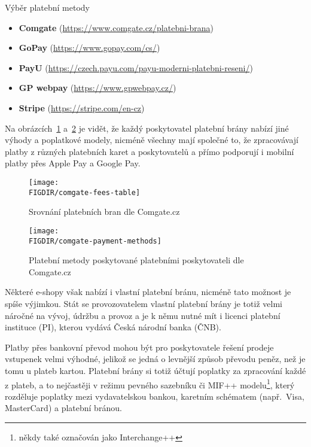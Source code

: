 \begin{subsection}{Výběr platební metody}
    \begin{itemize}
        \item \textbf{Comgate} (\url{https://www.comgate.cz/platebni-brana})
        \item \textbf{GoPay} (\url{https://www.gopay.com/cs/})
        \item \textbf{PayU} (\url{https://czech.payu.com/payu-moderni-platebni-reseni/})
        \item \textbf{GP webpay} (\url{https://www.gpwebpay.cz/})
        \item \textbf{Stripe} (\url{https://stripe.com/en-cz})
    \end{itemize}

    Na obrázcích~\ref{fig:comgate-fees-table} a~\ref{fig:comgate-payment-methods} je vidět, že každý poskytovatel platební brány nabízí jiné výhody a poplatkové modely, nicméně všechny mají společné to, že zpracovávají platby z různých platebních karet a poskytovatelů a přímo podporují i mobilní platby přes Apple Pay a Google Pay.

    \begin{figure}[H]
        \texttt{[image: \\FIGDIR/comgate-fees-table]}
        \centering
        \caption{Srovnání platebních bran dle Comgate.cz~\cite{comgate_srovnani_platebnich_bran}}
        \label{fig:comgate-fees-table}
    \end{figure}

    \begin{figure}[H]
        \texttt{[image: \\FIGDIR/comgate-payment-methods]}
        \centering
        \caption{Platební metody poskytované platebními poskytovateli dle Comgate.cz~\cite{comgate_srovnani_platebnich_bran}}
        \label{fig:comgate-payment-methods}
    \end{figure}

    Některé e-shopy však nabízí i vlastní platební bránu, nicméně tato možnost je spíše výjimkou.
    Stát se provozovatelem vlastní platební brány je totiž velmi náročné na vývoj, údržbu a provoz a je k němu nutné mít i licenci platební instituce (PI)\cite{schejbal_platebni_instituce}, kterou vydává Česká národní banka (ČNB)\cite{cnb_dohled_platebni_instituce}.

    Platby přes bankovní převod mohou být pro poskytovatele řešení prodeje vstupenek velmi výhodné, jelikož se jedná o levnější způsob převodu peněz, než je tomu u plateb kartou.
    Platební brány si totiž účtují poplatky za zpracování každé z plateb, a to nejčastěji v režimu pevného sazebníku či MIF++ modelu\footnote{někdy také označován jako Interchange++}, který rozděluje poplatky mezi vydavatelskou bankou, karetním schématem (např.\ Visa, MasterCard) a platební bránou\cite{gp_podpora_mif}.


\end{subsection}
